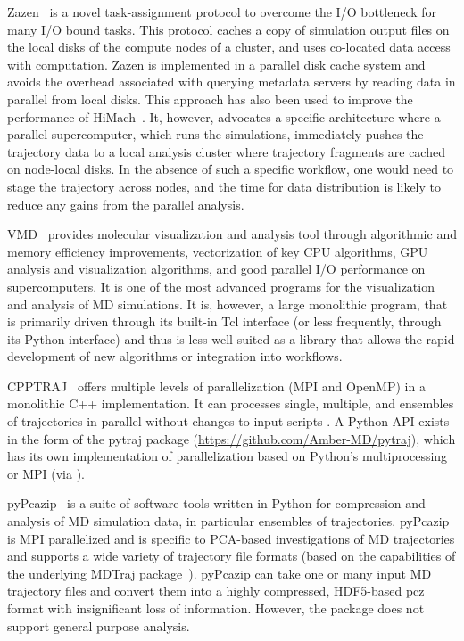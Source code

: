 Zazen~\cite{Zazen} is a novel task-assignment protocol to overcome the I/O bottleneck for many I/O bound tasks. This protocol caches a copy of simulation output files on the local disks of the compute nodes of a cluster, and uses co-located data access with computation. 
Zazen is implemented in a parallel disk cache system and avoids the overhead associated with querying metadata servers by reading data in parallel from local disks.
This approach has also been used to improve the performance of HiMach~\cite{himach-2008}.
It, however, advocates a specific architecture where a parallel supercomputer, which runs the simulations, immediately pushes the trajectory data to a local analysis cluster where trajectory fragments are cached on node-local disks.
In the absence of such a specific  workflow, one would need to stage the trajectory across nodes, and the time for data distribution is likely to reduce any gains from the parallel analysis.

VMD~\cite{Hum96, VMD2013} provides molecular visualization and analysis tool through algorithmic and memory efficiency improvements, vectorization of key CPU algorithms, GPU analysis and visualization algorithms, and good parallel I/O performance on supercomputers. It is one of the most advanced programs for the visualization and analysis of MD simulations. It is, however, a large monolithic program, that is primarily driven through its built-in Tcl interface (or less frequently, through its Python interface) and thus is less well suited as a library that allows the rapid development of new algorithms or integration into workflows.

CPPTRAJ~\cite{cpptraj-2013} offers multiple levels of parallelization (MPI and OpenMP) in a monolithic C++ implementation.
It can processes single, multiple, and ensembles of trajectories in parallel without changes to input scripts \cite{Roe:2018aa}. 
A Python API exists in the form of the pytraj package (\url{https://github.com/Amber-MD/pytraj}), which has its own implementation of parallelization based on Python's multiprocessing or MPI (via  \cite{Dalcin:2011aa, Dalcin:2005aa}).

pyPcazip~\cite{pyPcazip} is a suite of software tools written in Python for compression and analysis of MD simulation data, in particular ensembles of trajectories. 
pyPcazip is MPI parallelized and is specific to PCA-based investigations of MD trajectories and supports a wide variety of trajectory file formats (based on the capabilities of the underlying MDTraj package~\cite{McGibbon:2015aa}).
pyPcazip can take one or many input MD trajectory files and convert them into a highly compressed, HDF5-based pcz format with insignificant loss of information.
However, the package does not support general purpose analysis.

